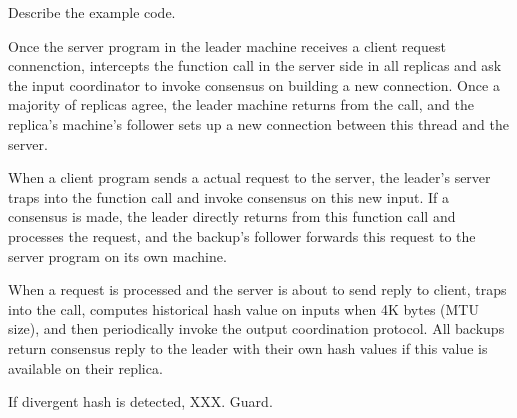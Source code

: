 Describe the example code.

Once the server program in the leader machine receives a client request 
connenction, \xxx intercepts the \accept function call in the server side in 
all replicas and ask the input coordinator to invoke consensus on building a 
new connection. Once a majority of replicas agree, the leader machine returns 
from the \accept call, and the replica's machine's follower sets up a new
connection between this thread and the server.

When a client program sends a actual request to the server, the leader's server 
traps into the \recv function call and invoke consensus on this new input. If 
a consensus is made, the leader directly returns from this function call and 
processes the request, and the backup's follower forwards this request to the 
server program on its own machine.

When a request is processed and the server is about to send reply to client, 
\xxx traps into the \send call, computes historical hash value on inputs when 
4K bytes (MTU size), and then periodically invoke the output coordination 
protocol. All backups return consensus reply to the leader with their own hash 
values if this value is available on their replica.

If divergent hash is detected, XXX. Guard.